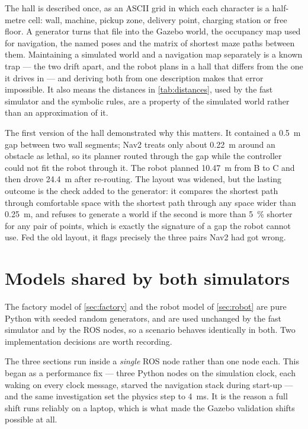 The hall is described once, as an ASCII grid in which each character is a half-metre cell: wall,
machine, pickup zone, delivery point, charging station or free floor. A generator turns that file
into the Gazebo world, the occupancy map used for navigation, the named poses and the matrix of
shortest maze paths between them. Maintaining a simulated world and a navigation map separately is
a known trap --- the two drift apart, and the robot plans in a hall that differs from the one it
drives in --- and deriving both from one description makes that error impossible. It also means the
distances in \cref{tab:distances}, used by the fast simulator and the symbolic rules, are a
property of the simulated world rather than an approximation of it.

The first version of the hall demonstrated why this matters. It contained a \SI{0.5}{\metre} gap
between two wall segments; Nav2 treats only about \SI{0.22}{\metre} around an obstacle as lethal, so
its planner routed through the gap while the controller could not fit the robot through it. The
robot planned \SI{10.47}{\metre} from B to C and then drove \SI{24.4}{\metre} after re-routing. The
layout was widened, but the lasting outcome is the check added to the generator: it compares the
shortest path through comfortable space with the shortest path through any space wider than
\SI{0.25}{\metre}, and refuses to generate a world if the second is more than \SI{5}{\percent}
shorter for any pair of points, which is exactly the signature of a gap the robot cannot use. Fed
the old layout, it flags precisely the three pairs Nav2 had got wrong.

\section{Models shared by both simulators}
\label{sec:models-shared}

The factory model of \cref{sec:factory} and the robot model of \cref{sec:robot} are pure Python
with seeded random generators, and are used unchanged by the fast simulator and by the ROS nodes,
so a scenario behaves identically in both. Two implementation decisions are worth recording.

The three sections run inside a \emph{single} ROS node rather than one node each. This began as a
performance fix --- three Python nodes on the simulation clock, each waking on every clock message,
starved the navigation stack during start-up --- and the same investigation set the physics step to
\SI{4}{\milli\second}. It is the reason a full shift runs reliably on a laptop, which is what made
the Gazebo validation shifts possible at all.

